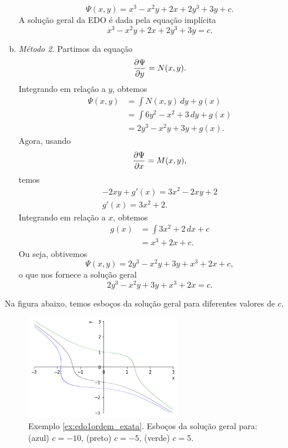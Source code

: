 \begin{ex}
\begin{enumerate}[a)]
\begin{equation}
      \Psi(x,y) = x^3 - x^2y + 2x + 2y^3 + 3y + c.
    \end{equation}
    A solução geral da EDO é dada pela equação implícita
    \begin{equation}
      x^3 - x^2y + 2x + 2y^3 + 3y = c.
    \end{equation}
  \item \emph{Método 2.}
    Partimos da equação
    \begin{equation}
      \frac{\partial\Psi}{\partial y} = N(x,y).
    \end{equation}
    Integrando em relação a $y$, obtemos
    \begin{align}
      \Psi(x,y) &= \int N(x,y)\,dy + g(x)\\
                &= \int 6y^2 - x^2 + 3\,dy + g(x) \\
                &= 2y^3 - x^2y + 3y + g(x).
    \end{align}
    Agora, usando
    \begin{equation}
      \frac{\partial\Psi}{\partial x} = M(x,y),
    \end{equation}
    temos
    \begin{gather}
      -2xy + g'(x) = 3x^2 - 2xy + 2 \\
           g'(x) = 3x^2 + 2.
    \end{gather}
    Integrando em relação a $x$, obtemos
    \begin{align}
      g(x) &= \int 3x^2 + 2\,dx + c \\
           &= x^3 + 2x + c.
    \end{align}
    Ou seja, obtivemos
    \begin{equation}
      \Psi(x,y) = 2y^3 - x^2y + 3y + x^3 + 2x + c,
    \end{equation}
    o que nos fornece a solução geral
    \begin{equation}
      2y^3 - x^2y + 3y + x^3 + 2x = c.
    \end{equation}
  \end{enumerate}

  Na figura abaixo, temos esboços da solução geral para diferentes valores de $c$.

  \begin{figure}[H]
    \centering
    \includegraphics[width=0.6\textwidth]{./cap_edo1ordem/dados/fig_ex_edo1ordem_exata/fig_ex_edo1ordem_exata}
    \caption{Exemplo \ref{ex:edo1ordem_exata}. Esboços da solução geral para: (azul) $c=-10$, (preto) $c=-5$, (verde) $c=5$.}
    \label{fig:ex_edo1ordem_exata}
  \end{figure}
  

\end{ex}
